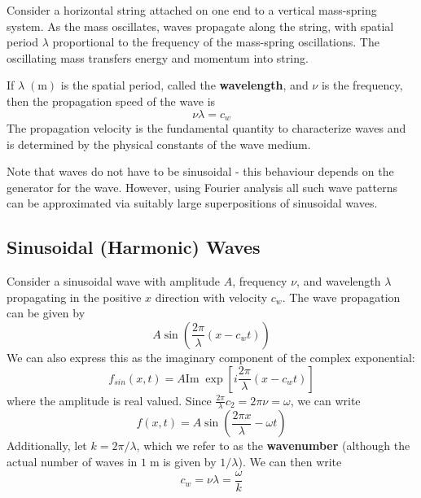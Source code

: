 \documentclass[12pt, a4paper, oneside, openright, titlepage]{book}
\begin{document}
Consider a horizontal string attached on one end to a vertical mass-spring system. As the mass oscillates, waves propagate along the string, with spatial period $\lambda$ proportional to the frequency of the mass-spring oscillations. The oscillating mass transfers energy and momentum into string.

If $\lambda \;(\text{m})$ is the spatial period, called the \textbf{wavelength}, and $\nu$ is the frequency, then the propagation speed of the wave is
\begin{equation*}
    \nu\lambda = c_w
\end{equation*}
The propagation velocity is the fundamental quantity to characterize waves and is determined by the physical constants of the wave medium. 

Note that waves do not have to be sinusoidal - this behaviour depends on the generator for the wave. However, using Fourier analysis all such wave patterns can be approximated via suitably large superpositions of sinusoidal waves.



\subsection{Sinusoidal (Harmonic) Waves}

Consider a sinusoidal wave with amplitude $A$, frequency $\nu$, and wavelength $\lambda$ propagating in the positive $x$ direction with velocity $c_w$. The wave propagation can be given by
\begin{equation}
    A\sin\left(\frac{2\pi}{\lambda}(x-c_wt)\right)
\end{equation}
We can also express this as the imaginary component of the complex exponential:
\begin{equation}
    f_{sin}(x,t) = A\text{Im}\;\exp\left[i\frac{2\pi}{\lambda}(x-c_wt)\right]
\end{equation}
where the amplitude is real valued. Since $\frac{2\pi}{\lambda}c_2 = 2\pi\nu = \omega$, we can write 
\begin{equation}
    f(x,t) = A\sin\left(\frac{2\pi x}{\lambda}-\omega t\right)
\end{equation}
Additionally, let $k = 2\pi/\lambda$, which we refer to as the \textbf{wavenumber} (although the actual number of waves in $1\;\text{m}$ is given by $1/\lambda$). We can then write
\begin{equation}
    c_w = \nu\lambda = \frac{\omega}{k}
\end{equation}
\end{document}
